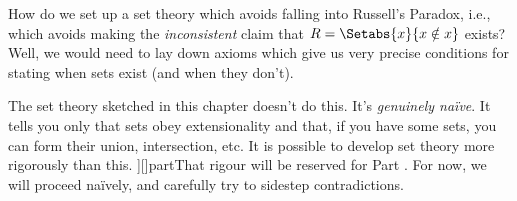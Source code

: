 \documentclass[../../../include/open-logic-section]{subfiles}
\begin{document}
\begin{digress}
How do we set up a set theory which avoids falling into
Russell's Paradox, i.e., which avoids making the \emph{inconsistent}
claim that $R = \Setabs{x}{x \notin x}$ exists? Well, we would need to
lay down axioms which give us very precise conditions for stating when
sets exist (and when they don't). 
	
The set theory sketched in this chapter doesn't do this. It's
\emph{genuinely na\"ive}. It tells you only that sets obey
extensionality and that, if you have some sets, you can form their
union, intersection, etc. It is possible to develop set theory more
rigorously than this. \oliflabeldef[cumul][]][]{part}{That rigour will be
reserved for Part . For now, we will proceed
na\"ively, and carefully try to sidestep contradictions.}{}
\end{digress}
\end{document}

